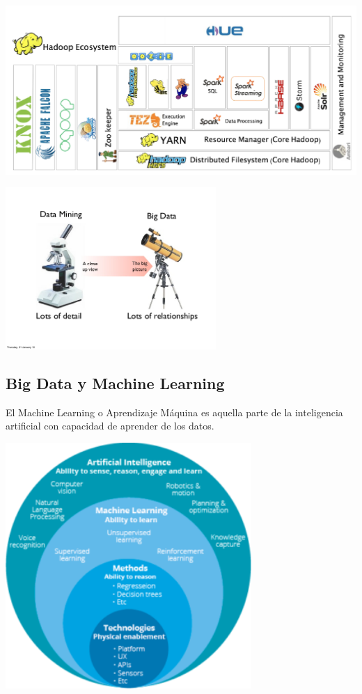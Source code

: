 \documentclass[
]{book}
\begin{document}
\includegraphics{images/T3-ecosistema.png}

\includegraphics[width=0.6\textwidth,height=\textheight]{images/T3-DMvsBD.jpg}

\subsection{Big Data y Machine Learning}\label{big-data-y-machine-learning}

El Machine Learning o Aprendizaje Máquina es aquella parte de la inteligencia artificial con capacidad de aprender de los datos.

\includegraphics[width=0.7\textwidth,height=\textheight]{images/T3-AI-ML.png}
\end{document}
